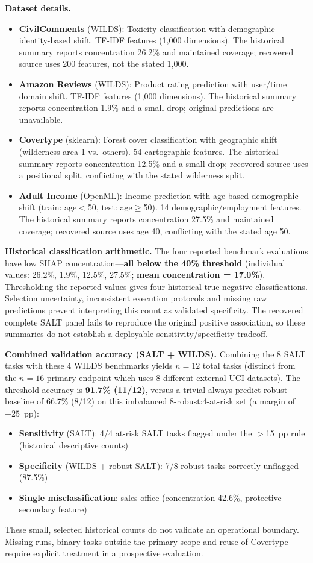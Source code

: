 \documentclass[accepted]{uai2026} %
\begin{document}
\textbf{Dataset details.}
\begin{itemize}[nosep,leftmargin=*]
    \item \textbf{CivilComments} (WILDS): Toxicity classification with demographic identity-based shift. TF-IDF features (1,000 dimensions). The historical summary reports concentration 26.2\% and maintained coverage; recovered source uses 200 features, not the stated 1,000.
    \item \textbf{Amazon Reviews} (WILDS): Product rating prediction with user/time domain shift. TF-IDF features (1,000 dimensions). The historical summary reports concentration 1.9\% and a small drop; original predictions are unavailable.
    \item \textbf{Covertype} (sklearn): Forest cover classification with geographic shift (wilderness area 1 vs.\ others). 54 cartographic features. The historical summary reports concentration 12.5\% and a small drop; recovered source uses a positional split, conflicting with the stated wilderness split.
    \item \textbf{Adult Income} (OpenML): Income prediction with age-based demographic shift (train: age$<$50, test: age$\geq$50). 14 demographic/employment features. The historical summary reports concentration 27.5\% and maintained coverage; recovered source uses age 40, conflicting with the stated age 50.
\end{itemize}

\textbf{Historical classification arithmetic.} The four reported benchmark evaluations have low SHAP concentration---\textbf{all below the 40\% threshold} (individual values: 26.2\%, 1.9\%, 12.5\%, 27.5\%; \textbf{mean concentration = 17.0\%}). Thresholding the reported values gives four historical true-negative classifications. Selection uncertainty, inconsistent execution protocols and missing raw predictions prevent interpreting this count as validated specificity. The recovered complete SALT panel fails to reproduce the original positive association, so these summaries do not establish a deployable sensitivity/specificity tradeoff.

\textbf{Combined validation accuracy (SALT + WILDS).} Combining the 8 SALT tasks with these 4 WILDS benchmarks yields $n=12$ total tasks (distinct from the $n=16$ primary endpoint which uses 8 different external UCI datasets). The threshold accuracy is \textbf{91.7\% (11/12)}, versus a trivial always-predict-robust baseline of 66.7\% (8/12) on this imbalanced 8-robust:4-at-risk set (a margin of $+25$~pp):
\begin{itemize}[nosep,leftmargin=*]
    \item \textbf{Sensitivity} (SALT): 4/4 at-risk SALT tasks flagged under the $>$15~pp rule (historical descriptive counts)
    \item \textbf{Specificity} (WILDS + robust SALT): 7/8 robust tasks correctly unflagged (87.5\%)
    \item \textbf{Single misclassification}: sales-office (concentration 42.6\%, protective secondary feature)
\end{itemize}

These small, selected historical counts do not validate an operational boundary. Missing runs, binary tasks outside the primary scope and reuse of Covertype require explicit treatment in a prospective evaluation.
\end{document}
